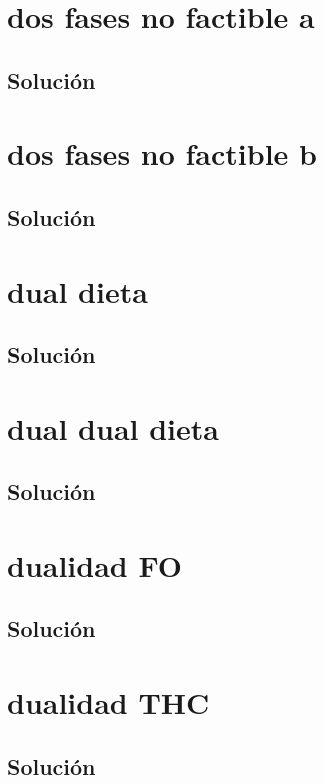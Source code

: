 \documentclass[a4paper,10pt,onecolumn]{report}
\begin{document}
\section{dos fases no factible a}

\subsection*{Solución}

\clearpage
\section{dos fases no factible b}

\subsection*{Solución}

\clearpage
\section{dual dieta}

\subsection*{Solución}

\clearpage
\section{dual dual dieta}

\subsection*{Solución}

\clearpage
\section{dualidad FO}

\subsection*{Solución}

\clearpage
\section{dualidad THC}

\subsection*{Solución}

\clearpage
\end{document}
